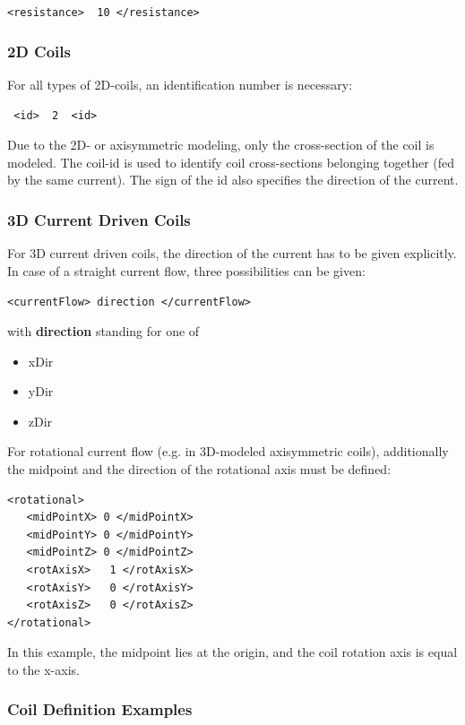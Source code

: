 \verb!<resistance>  10 </resistance>!

\subsubsection{2D Coils}
For all types of 2D-coils, an identification number is
necessary:

\verb! <id>  2  <id>!

\noindent
Due to the 2D- or axisymmetric modeling, only the cross-section of the
coil is modeled. The coil-id is
used to identify coil cross-sections belonging together (fed by the
same current). 
The sign of the id also specifies the direction of the current.


\subsubsection{3D Current Driven Coils}
For 3D current driven coils, the direction of the current has to be
given explicitly. In case of a straight current flow, three
possibilities can be given:

\verb!<currentFlow> direction </currentFlow>!

\noindent
with {\bf direction} standing for one of 
\begin{itemize}
\item xDir
\item yDir
\item zDir
\end{itemize}
   
For rotational current flow (e.g. in 3D-modeled axisymmetric coils),
additionally the midpoint and the direction of the rotational axis
must be defined:

\begin{verbatim}
<rotational>
   <midPointX> 0 </midPointX>
   <midPointY> 0 </midPointY>
   <midPointZ> 0 </midPointZ>
   <rotAxisX>   1 </rotAxisX>
   <rotAxisY>   0 </rotAxisY>
   <rotAxisZ>   0 </rotAxisZ>
</rotational>
\end{verbatim}

In this example, the midpoint lies at the origin, and the coil
rotation axis is equal to the x-axis.





\subsubsection{Coil Definition Examples}

